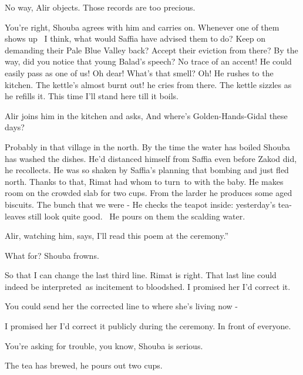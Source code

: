 \documentclass[letterpaper]{article}
\begin{document}
{\textquotedbl}No way,{\textquotedbl} Alir objects. {\textquotedbl}Those records are too precious.{\textquotedbl} 

{\textquotedbl}You're right,{\textquotedbl} Shouba agrees with him and carries on. {\textquotedbl}Whenever one of them
shows up \ I think, what would Saffia have advised them to do? Keep on demanding their Pale Blue Valley back? Accept
their eviction from there? By the way, did you notice that young Balad's speech? No trace of an accent! He could easily
pass as one of us! Oh dear! What's that smell? Oh!{\textquotedbl} He rushes to the kitchen. {\textquotedbl}The kettle's
almost burnt out!{\textquotedbl} he cries from there. The kettle sizzles as he refills it. {\textquotedbl}This time
I'll stand here till it boils.{\textquotedbl}

Alir joins him in the kitchen and asks, {\textquotedbl}And where's Golden-Hands-Gidal these days?{\textquotedbl} 

{\textquotedbl}Probably in that village in the north.{\textquotedbl} By the time the water has boiled Shouba has washed
the dishes. {\textquotedbl}He'd distanced himself from Saffia even before Zakod did,{\textquotedbl} he recollects.
{\textquotedbl}He was so shaken by Saffia's planning that bombing and just fled north. Thanks to that, Rimat had whom
to turn~to with the baby.{\textquotedbl} He makes room on the crowded slab for two cups. From the larder he produces
some aged biscuits. {\textquotedbl}The bunch that we were -{\textquotedbl} He checks the teapot inside: yesterday's
tea-leaves still look quite good. ~He pours on them the scalding water.

Alir, watching him, says, {\textquotedbl}I'll read this poem at the ceremony.''~ 

{\textquotedbl}What for?{\textquotedbl} Shouba frowns. \ 

{\textquotedbl}So that I can change the last third line. Rimat is right. That last line could indeed be interpreted~as
incitement to bloodshed. I promised her I'd correct it.{\textquotedbl} 

{\textquotedbl}You could send her the corrected line to where she's living now -{\textquotedbl} 

{\textquotedbl}I promised her I'd correct it publicly during the ceremony. In front of everyone.{\textquotedbl}~ 

{\textquotedbl}You're asking for trouble, you know,{\textquotedbl} Shouba is serious.

The tea has brewed, he pours out two cups. 
\end{document}
